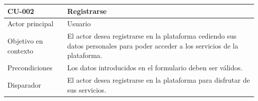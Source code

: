 \begin{table}[htpb]
\centering
\begin{tabularx}{\textwidth}{|l|X|}
\hline
CU-002                            & Registrarse                                                                                                                                                                                                                                                                                                                                                                                                                    \\ \hline
Actor principal                   & Usuario                                                                                                                                                                                                                                                                                                                                                                                                                        \\ \hline
Objetivo en contexto              & El actor desea registrarse en la plataforma cediendo sus datos personales para poder acceder a los servicios de la plataforma.                                                                                                                                                                                                                                                                                                 \\ \hline
Precondiciones                    & Los datos introducidos en el formulario deben ser válidos.                                                                                                                                                                                                                                                                                                                                                                     \\ \hline
Disparador                        & El actor desea registrarse en la plataforma para disfrutar de sus servicios.                                                                                                                                                                                                                                                                                                                                                   \\ \hline

\end{tabularx}
\end{table}
